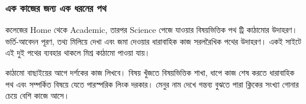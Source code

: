 \subsubsection{এক কাজের জন্য এক ধরনের পথ}
কলেজের Home থেকে Academic, তারপর Science পেজে যাওয়ার বিষয়ভিত্তিক পথ ট্রি কাঠামোর উদাহরণ। ভর্তি-আবেদন পূরণ, তথ্য মিলিয়ে দেখা এবং জমা দেওয়ার ধারাবাহিক কাজ সরলরৈখিক পথের উদাহরণ। একই সাইটে এই দুই পথের ব্যবহার থাকলে মিশ্র কাঠামো পাওয়া যায়।

কাঠামো বাছাইয়ের আগে দর্শকের কাজ লিখবে। বিষয় খুঁজতে বিষয়ভিত্তিক শাখা, ধাপে কাজ শেষ করতে ধারাবাহিক পথ এবং সম্পর্কিত বিষয়ে যেতে পারস্পরিক লিংক দরকার। মেনুর নাম দেখে গন্তব্য বুঝতে পারা ক্লিকের সংখ্যা গোনার চেয়ে বেশি কাজে আসে।
